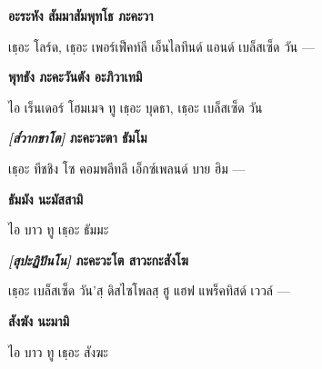 \textbf{อะระหัง สัมมาสัมพุทโธ ภะคะวา}

\begin{english}
	เธฺอะ โลร์ด, เธฺอะ เพอร์เฟ็คท์ลี เอ็นไลทึนด์ แอนด์ เบล็สเซ็ด  วัน —
\end{english}

\textbf{พุทธัง ภะคะวันตัง อะภิวาเทมิ}

\begin{english}
	ไอ เร็นเดอร์ โฮมเมจ ทู เธฺอะ บุดธา, เธฺอะ เบล็สเซ็ด  วัน  
\end{english}

\textbf{\textit{[ส๎วากขาโต]} ภะคะวะตา ธัมโม}

\begin{english}
	เธฺอะ ทีชชิง  โซ คอมพลีทลี เอ็กซ์เพลนด์ บาย ฮิม —
\end{english}

\textbf{ธัมมัง นะมัสสามิ}

\begin{english}
	ไอ บาว ทู เธฺอะ ธัมมะ  
\end{english}

\textbf{\textit{[สุปะฏิปันโน]} ภะคะวะโต สาวะกะสังโฆ}

\begin{english}
เธฺอะ เบล็สเซ็ด  วัน’สฺ ดิสไซโพลสฺ ฮู แฮฟ แพร็คทิสด์ เววล์ —
\end{english}

\textbf{สังฆัง นะมามิ}

\begin{english}
	ไอ บาว ทู เธฺอะ สังฆะ 
\end{english}
